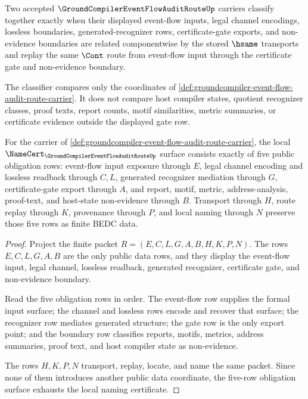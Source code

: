 \begin{definition}
\label{def:groundcompiler-event-flow-audit-route-classifier}
Two accepted $\GroundCompilerEventFlowAuditRouteUp$ carriers classify together exactly when their displayed event-flow inputs, legal channel encodings, lossless boundaries, generated-recognizer rows, certificate-gate exports, and non-evidence boundaries are related componentwise by the stored $\hsame$ transports and replay the same $\Cont$ route from event-flow input through the certificate gate and non-evidence boundary.

The classifier compares only the coordinates of \autoref{def:groundcompiler-event-flow-audit-route-carrier}. It does not compare host compiler states, quotient recognizer classes, proof texts, report counts, motif similarities, metric summaries, or certificate evidence outside the displayed gate row.
\end{definition}

\begin{theorem}
\label{thm:groundcompiler-event-flow-audit-route-namecert-obligations}
For the carrier of \autoref{def:groundcompiler-event-flow-audit-route-carrier}, the local $\NameCert_{\GroundCompilerEventFlowAuditRouteUp}$ surface consists exactly of five public obligation rows: event-flow input exposure through $E$, legal channel encoding and lossless readback through $C,L$, generated recognizer mediation through $G$, certificate-gate export through $A$, and report, motif, metric, address-analysis, proof-text, and host-state non-evidence through $B$. Transport through $H$, route replay through $K$, provenance through $P$, and local naming through $N$ preserve those five rows as finite BEDC data.
\end{theorem}
\begin{proof}
Project the finite packet $R=(E,C,L,G,A,B,H,K,P,N)$. The rows $E,C,L,G,A,B$ are the only public data rows, and they display the event-flow input, legal channel, lossless readback, generated recognizer, certificate gate, and non-evidence boundary.

Read the five obligation rows in order. The event-flow row supplies the formal input surface; the channel and lossless rows encode and recover that surface; the recognizer row mediates generated structure; the gate row is the only export point; and the boundary row classifies reports, motifs, metrics, address summaries, proof text, and host compiler state as non-evidence.

The rows $H,K,P,N$ transport, replay, locate, and name the same packet. Since none of them introduces another public data coordinate, the five-row obligation surface exhausts the local naming certificate.
\end{proof}

